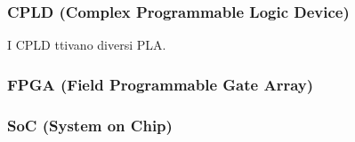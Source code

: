 \documentclass[a4paper]{article}
\theoremstyle{break}
\theoremstyle{break}
\theoremstyle{break}
\theoremstyle{break}
\begin{document}
\subsubsection{CPLD (Complex Programmable Logic Device)}
I CPLD ttivano diversi PLA.
\label{D2}

\subsubsection{FPGA (Field Programmable Gate Array)}
\label{D3}


\subsubsection{SoC (System on Chip)}
\label{D4}
\end{document}
